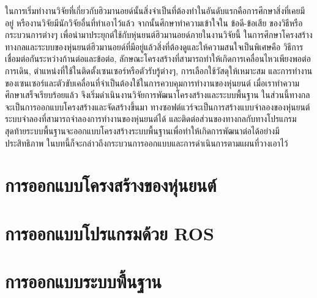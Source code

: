 ในการเริ่มทำงานวิจัยที่เกี่ยวกับฮิวมานอยด์นั้นสิ่งจำเป็นที่ต้องทำในอันดับแรกคือการศึกษาสิ่งที่เคยมีอยู่ หรืองานวิจัยมีนักวิจัยอื่นที่ทำเอาไว้แล้ว
จากนั้นศึกษาทำความเข้าใจใน ข้อดี-ข้อเสีย ของวิธีหรือกระบวนการต่างๆ เพื่อนำมาประยุกต์ใช้กับหุ่นยนต์ฮิวมานอยด์ภายในงานวิจัยนี้
ในการศึกษาโครงสร้างทางกลและระบบของหุ่นยนต์ฮิวมานอยด์ที่มีอยู่แล้วสิ่งที่ต้องดูและให้ความสนใจเป็นพิเศษคือ
วิธีการเชื่อมต่อกันระหว่างก้านต่อและข้อต่อ, ลักษณะโครงสร้างที่สามารถทำให้เกิดการเคลื่อนไหวเพียงพอต่อการเดิน,
ตำแหน่งที่ใช้ในติดตั้งเซนเซอร์หรือตัวรับรู้ต่างๆ, การเลือกใช้วัสดุให้เหมาะสม
และการทำงานของเซนเซอร์และตัวขับเคลื่อนที่จำเป็นต้องใช้ในการควบคุมการทำงานของหุ่นยนต์
เมื่อเราทำความศึกษาเสร็จเรียบร้อยแล้ว จึงเริ่มดำเนินงานวิจัยการพัฒนาโครงสร้างและระบบพื้นฐาน
ในส่วนนี้ทางกลจะเป็นการออกแบบโครงสร้างและจัดสร้างขึ้นมา ทางซอฟต์แวร์จะเป็นการสร้างแบบจำลองของหุ่นยนต์
ระบบจำลองที่สามารถจำลองการทำงานของหุ่นยนต์ได้ และติดต่อส่วนของทางกลกับทางโปรแกรม
สุดท้ายระบบพื้นฐานจะออกแบบโครงสร้างระบบพื้นฐานเพื่อทำให้เกิดการพัฒนาต่อได้อย่างมีประสิทธิภาพ
ในบทนี้ก็จะกล่าวถึงกระบวนการออกแบบและการดำเนินการตามแผนที่วางเอาไว้

\clearpage
\section{การออกแบบโครงสร้างของหุ่นยนต์}


\clearpage
\section{การออกแบบโปรแกรมด้วย ROS}


\clearpage
\section{การออกแบบระบบพื้นฐาน}


